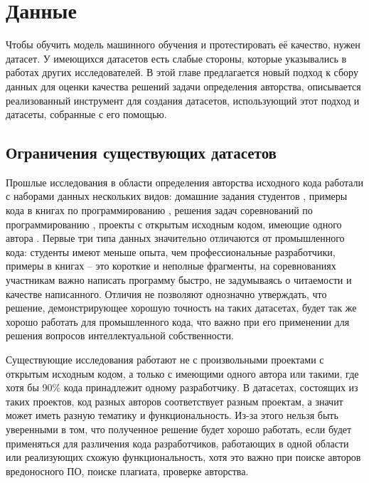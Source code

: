 \section{Данные}\label{sec:data}
Чтобы обучить модель машинного обучения и протестировать её качество, нужен датасет. У имеющихся датасетов есть слабые стороны, которые указывались в работах других исследователей. В этой главе предлагается новый подход к сбору данных для оценки качества решений задачи определения авторства, описывается реализованный инструмент для создания датасетов, использующий этот подход и датасеты, собранные с его помощью.

\subsection{Ограничения существующих датасетов}
Прошлые исследования в области определения авторства исходного кода работали с наборами данных нескольких видов: домашние задания студентов \cite{Frantzeskou2007,Elenbogen2008,Krsul1997}, примеры кода в книгах по программированию \cite{Oman1989,Frantzeskou2006}, решения задач соревнований по программированию \cite{Rosenblum2011,Caliskan2015,Alsulami2017,Simko2018}, проекты с открытым исходным кодом, имеющие одного автора \cite{Shevertalov2009,Kothari2007,Yang2017,Zhang2017}. Первые три типа данных значительно отличаются от промышленного кода: студенты имеют меньше опыта, чем профессиональные разработчики, примеры в книгах – это короткие и неполные фрагменты, на соревнованиях участникам важно написать программу быстро, не задумываясь о читаемости и качестве написанного. Отличия не позволяют однозначно утверждать, что решение, демонстрирующее хорошую точность на таких датасетах, будет так же хорошо работать для промышленного кода, что важно при его применении для решения вопросов интеллектуальной собственности.

Существующие исследования работают не с произвольными проектами с открытым исходным кодом, а только с имеющими одного автора или такими, где хотя бы 90\% кода принадлежит одному разработчику. В датасетах, состоящих из таких проектов, код разных авторов соответствует разным проектам, а значит может иметь разную тематику и функциональность. Из-за этого нельзя быть уверенными в том, что полученное решение будет хорошо работать, если будет применяться для различения кода разработчиков, работающих в одной области или реализующих схожую функциональность, хотя это важно при поиске авторов вредоносного ПО, поиске плагиата, проверке авторства.


